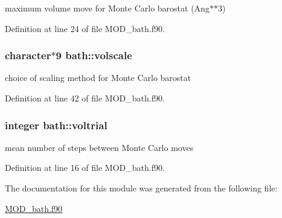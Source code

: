 maximum volume move for Monte Carlo barostat (Ang$\ast$$\ast$3) 



Definition at line 24 of file M\-O\-D\-\_\-bath.\-f90.

\hypertarget{classbath_a91d816721d0a28155db7384add3bd4a6}{
\subsubsection[{volscale}]{\setlength{\rightskip}{0pt plus 5cm}character$\ast$9 bath\-::volscale}}\label{classbath_a91d816721d0a28155db7384add3bd4a6}


choice of scaling method for Monte Carlo barostat 



Definition at line 42 of file M\-O\-D\-\_\-bath.\-f90.

\hypertarget{classbath_af2527ee0ddc6dbab83c329ff48a28b49}{
\subsubsection[{voltrial}]{\setlength{\rightskip}{0pt plus 5cm}integer bath\-::voltrial}}\label{classbath_af2527ee0ddc6dbab83c329ff48a28b49}


mean number of steps between Monte Carlo moves 



Definition at line 16 of file M\-O\-D\-\_\-bath.\-f90.



The documentation for this module was generated from the following file\-:\begin{DoxyCompactItemize}
\item 
\hyperlink{MOD__bath_8f90}{M\-O\-D\-\_\-bath.\-f90}\end{DoxyCompactItemize}
